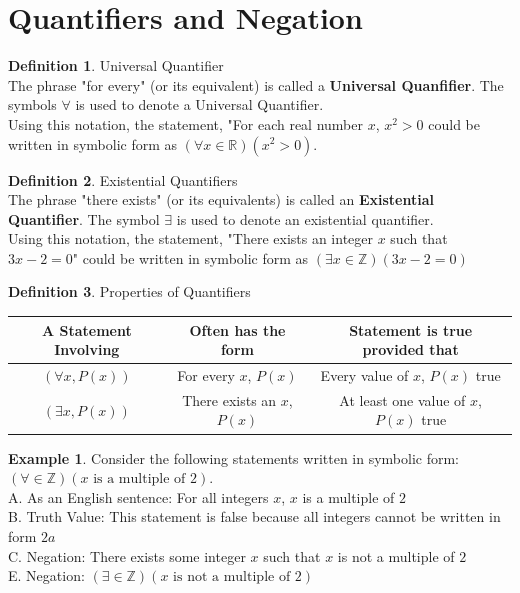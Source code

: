 \documentclass{book}
\theoremstyle{definition}
\newtheorem{definition}{Definition}[section]
\newtheorem{example}{Example}[definition]
\theoremstyle{remark}
\newcommand{\bb}[1]{\mathbb{#1}}
\begin{document}
\newpage
\section{Quantifiers and Negation}

\begin{definition}
Universal Quantifier \\

The phrase "for every" (or its equivalent) is called a {\bf Universal Quanfifier}. The symbols $\forall$ is used to denote a Universal Quantifier. \\
Using this notation, the statement, "For each real number $x$, $x^2 > 0$ could be written in symbolic form as $(\forall x \in \bb{R})(x^2 > 0)$.  

\end{definition} 


\begin{definition}
Existential Quantifiers \\

The phrase "there exists" (or its equivalents) is called an {\bf Existential Quantifier}. The symbol $\exists$ is used to denote an existential quantifier. \\
Using this notation, the statement, "There exists an integer $x$ such that $3x - 2 = 0$" could be written in symbolic form as $(\exists x \in \bb{Z})(3x - 2 = 0)$
\end{definition} 


\begin{definition}
Properties of Quantifiers \\

\begin{center}
	\begin{tabular}{|c|c|c|}
		\hline 
		{\bf A Statement Involving} & {\bf Often has the form} & {\bf Statement is true provided that} \\ 
		\hline 
		$(\forall x, P(x))$ & For every $x$, $P(x)$ & Every value of $x$, $P(x)$ true \\ 
		\hline 
		$(\exists x, P(x))$ & There exists an $x$, $P(x)$ & At least one value of $x$, $P(x)$ true \\  
		\hline 
	\end{tabular} 
\end{center}
\end{definition}



\begin{example}
Consider the following statements written in symbolic form: $(\forall \in \bb{Z})(x \text{ is a multiple of }2)$. \\
A. As an English sentence: For all integers $x$, $x$ is a multiple of $2$ \\
B. Truth Value: This statement is false because all integers cannot be written in form $2a$ \\
C. Negation: There exists some integer $x$ such that $x$ is not a multiple of $2$ \\
E. Negation: $(\exists \in \bb{Z})(x \text{ is not a multiple of }2)$ \\
\end{example}
\end{document}
